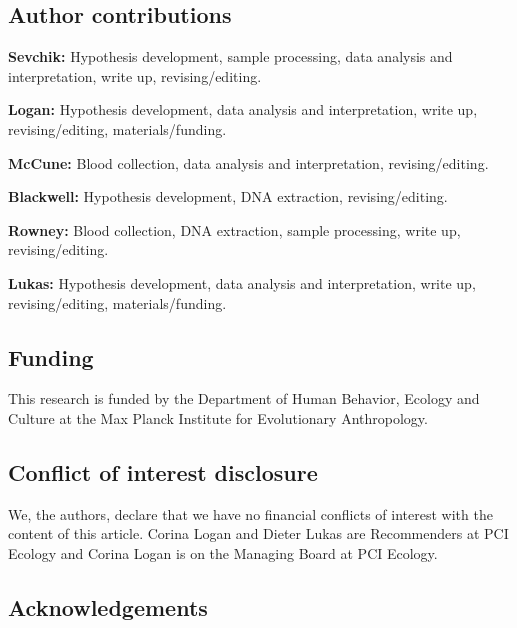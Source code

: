 \documentclass[
]{article}
\begin{document}
\hypertarget{author-contributions}{%
\subsection{Author contributions}\label{author-contributions}}

\textbf{Sevchik:} Hypothesis development, sample processing, data
analysis and interpretation, write up, revising/editing.

\textbf{Logan:} Hypothesis development, data analysis and
interpretation, write up, revising/editing, materials/funding.

\textbf{McCune:} Blood collection, data analysis and interpretation,
revising/editing.

\textbf{Blackwell:} Hypothesis development, DNA extraction,
revising/editing.

\textbf{Rowney:} Blood collection, DNA extraction, sample processing,
write up, revising/editing.

\textbf{Lukas:} Hypothesis development, data analysis and
interpretation, write up, revising/editing, materials/funding.

\hypertarget{funding}{%
\subsection{Funding}\label{funding}}

This research is funded by the Department of Human Behavior, Ecology and
Culture at the Max Planck Institute for Evolutionary Anthropology.

\hypertarget{conflict-of-interest-disclosure}{%
\subsection{Conflict of interest
disclosure}\label{conflict-of-interest-disclosure}}

We, the authors, declare that we have no financial conflicts of interest
with the content of this article. Corina Logan and Dieter Lukas are
Recommenders at PCI Ecology and Corina Logan is on the Managing Board at
PCI Ecology.

\hypertarget{acknowledgements}{%
\subsection{Acknowledgements}\label{acknowledgements}}
\end{document}
